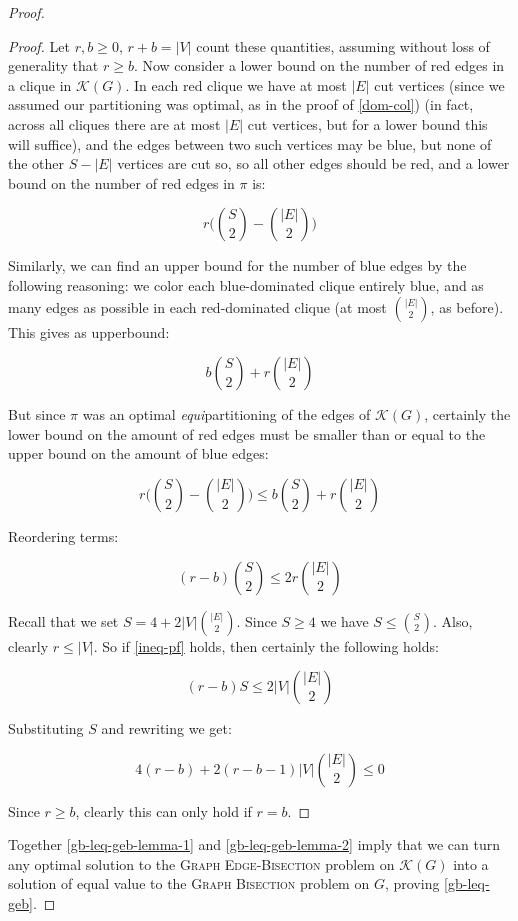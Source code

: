 \documentclass{article}
\newcommand{\gb}{\textsc{Graph \allowbreak Bisection} }
\newcommand{\geb}{\textsc{Graph \allowbreak Edge-\allowbreak Bisection} }
\begin{document}
\begin{proof}
\begin{proof}
			Let $r,b \geq 0$, $r+b=|V|$ count these quantities, assuming
			without loss of generality that $r \geq b$. Now consider a lower
			bound on the number of red edges in a clique in $\mathcal{K}(G)$.
			In each red clique we have at most
			$|E|$ cut vertices (since we assumed our partitioning was optimal,
			as in the proof of \autoref{dom-col}) (in fact,
			across all cliques there are at most $|E|$ cut vertices, but for a
			lower bound this will suffice), and the edges between two such
			vertices may be blue, but none of the other $S - |E|$ vertices are
			cut so, so all other edges should be red, and a lower
			bound on the number of red edges in $\pi$ is:

			$$r\Big( \binom{S}{2} - \binom{|E|}{2}\Big)$$

			Similarly, we can find an upper bound for the number of blue edges
			by the following reasoning: we color each blue-dominated clique
			entirely blue, and as many edges as possible in each red-dominated
			clique (at most $\binom{|E|}{2}$, as before). This gives as
			upperbound:

			$$b\binom{S}{2} + r\binom{|E|}{2}$$

			But since $\pi$ was an optimal \textit{equi}partitioning of the
			edges of $\mathcal{K}(G)$, certainly the lower bound on the amount
			of red edges must be smaller than or equal to the upper bound on
			the amount of blue edges:

			$$r\Big( \binom{S}{2} - \binom{|E|}{2}\Big)
				\leq b\binom{S}{2} + r\binom{|E|}{2}$$

			Reordering terms:

			\begin{equation}
				\label{ineq-pf}
				(r-b)\binom{S}{2} \leq 2r\binom{|E|}{2}
			\end{equation}

			Recall that we set $S = 4 + 2|V|\binom{|E|}{2}$. Since $S \geq 4$
			we have $S \leq \binom{S}{2}$. Also, clearly $r \leq |V|$. So if
			\autoref{ineq-pf} holds, then certainly the following holds:

			$$(r-b)S \leq 2|V|\binom{|E|}{2}$$

			Substituting $S$ and rewriting we get:

			$$4(r-b) + 2(r-b-1)|V|\binom{|E|}{2} \leq 0$$
 
			Since $r \geq b$, clearly this can only hold if $r=b$.
		\end{proof}

		Together \autoref{gb-leq-geb-lemma-1} and \autoref{gb-leq-geb-lemma-2}
		imply that we can turn any optimal solution to the \geb problem on
		$\mathcal{K}(G)$ into a solution of equal value to the \gb problem on
		$G$, proving \autoref{gb-leq-geb}.
	\end{proof}
\end{document}
